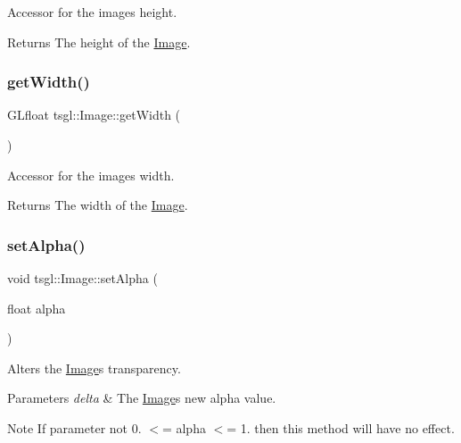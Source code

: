 Accessor for the image\textquotesingle{}s height. 

\begin{DoxyReturn}{Returns}
The height of the \hyperlink{classtsgl_1_1_image}{Image}. 
\end{DoxyReturn}
\mbox{\label{classtsgl_1_1_image_ace08e96c94a3798d6fdb6cb60259e3fc}} 
\subsubsection{\texorpdfstring{get\+Width()}{getWidth()}}
{\footnotesize\ttfamily G\+Lfloat tsgl\+::\+Image\+::get\+Width (\begin{DoxyParamCaption}{ }\end{DoxyParamCaption})\hspace{0.3cm}{\ttfamily [inline]}}



Accessor for the image\textquotesingle{}s width. 

\begin{DoxyReturn}{Returns}
The width of the \hyperlink{classtsgl_1_1_image}{Image}. 
\end{DoxyReturn}
\mbox{\label{classtsgl_1_1_image_a8d6beb3a072efc029af9ca66f7e2d399}} 
\subsubsection{\texorpdfstring{set\+Alpha()}{setAlpha()}}
{\footnotesize\ttfamily void tsgl\+::\+Image\+::set\+Alpha (\begin{DoxyParamCaption}\item[{float}]{alpha }\end{DoxyParamCaption})}



Alters the \hyperlink{classtsgl_1_1_image}{Image}\textquotesingle{}s transparency. 


\begin{DoxyParams}{Parameters}
{\em delta} & The \hyperlink{classtsgl_1_1_image}{Image}\textquotesingle{}s new alpha value. \\
\hline
\end{DoxyParams}
\begin{DoxyNote}{Note}
If parameter not 0. $<$= alpha $<$= 1. then this method will have no effect. 
\end{DoxyNote}



